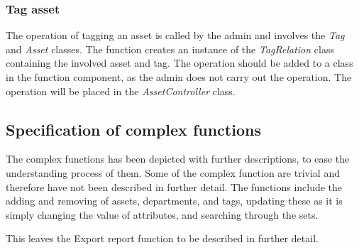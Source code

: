 \subsubsection{Tag asset}
The operation of tagging an asset is called by the admin and involves the \textit{Tag} and \textit{Asset} classes. The function creates an instance of the \textit{TagRelation} class containing the involved asset and tag. The operation should be added to a class in the function component, as the admin does not carry out the operation. The operation will be placed in the \textit{AssetController} class.

\subsection{Specification of complex functions}
The complex functions has been depicted with further descriptions, to ease the understanding process of them. Some of the complex function are trivial and therefore have not been described in further detail. The functions include the adding and removing of assets, departments, and tags, updating these as it is simply changing the value of attributes, and searching through the sets.
\par
This leaves the Export report function to be described in further detail.
